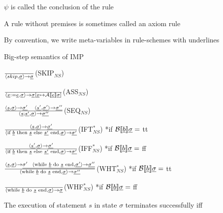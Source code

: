 		\item $\psi$ is called the conclusion of the rule
		\item A rule without premises is sometimes called an axiom rule
		\item By convention, we write meta-variables in rule-schemes with underlines
	\enumend
	\item Big-step semantics of IMP
	\enumstart
		\item $\frac{}{\langle skip, \underline{\sigma} \rangle \rightarrow \underline{\sigma}}$(SKIP$_{NS}$)
		\item $\frac{}{\langle \underline{x} := \underline{e}, \underline{\sigma} \rangle \rightarrow \underline{\sigma}[\underline{x} \mapsto \mathcal{A}\llbracket \underline{e}\rrbracket\underline{\sigma}]}$(ASS$_{NS}$)
		\item $\frac{\langle \underline{s}, \underline{\sigma} \rangle \rightarrow \underline{\sigma'} \ \ \ \langle \underline{s'}, \underline{\sigma'}\rangle \rightarrow \underline{\sigma''}}{\langle \underline{s}; \underline{s'}, \underline{\sigma}\rangle \rightarrow \underline{\sigma''}}$(SEQ$_{NS}$)
		\item $\frac{\langle \underline{s}, \underline{\sigma} \rangle \rightarrow \underline{\sigma'}}{\langle \text{if }\underline{b} \text{ then }\underline{s}\text{ else } \underline{s'}\text{ end}, \underline{\sigma}\rangle \rightarrow \underline{\sigma'}}$(IFT$^*_{NS}$) *if $\mathcal{B}\llbracket \underline{b} \rrbracket \underline{\sigma} =$ tt
		\item $\frac{\langle \underline{s'}, \underline{\sigma} \rangle \rightarrow \underline{\sigma'}}{\langle \text{if }\underline{b} \text{ then }\underline{s}\text{ else } \underline{s'}\text{ end}, \underline{\sigma}\rangle \rightarrow \underline{\sigma'}}$(IFF$^*_{NS}$) *if $\mathcal{B}\llbracket \underline{b} \rrbracket \underline{\sigma} =$ ff
		\item $\frac{\langle \underline{s}, \underline{\sigma} \rangle \rightarrow \underline{\sigma' \ \ \langle \text{while } \underline{b} \text{ do } \underline{s} \text{ end}, \underline{\sigma'}\rangle \rightarrow \underline{\sigma''}}}{\langle \text{while } \underline{b} \text{ do } \underline{s} \text{ end}, \underline{\sigma} \rangle \rightarrow \underline{\sigma''}}$(WHT$^*_{NS}$) *if $\mathcal{B}\llbracket \underline{b} \rrbracket \underline{\sigma} =$ tt
		\item $\frac{}{\langle \text{while } \underline{b} \text{ do } \underline{s} \text{ end}, \underline{\sigma} \rangle \rightarrow \underline{\sigma}}$(WHF$^*_{NS}$) *if $\mathcal{B}\llbracket \underline{b} \rrbracket \underline{\sigma} =$ ff
	\enumend
	\item The execution of statement $s$ in state $\sigma$ terminates successfully iff
